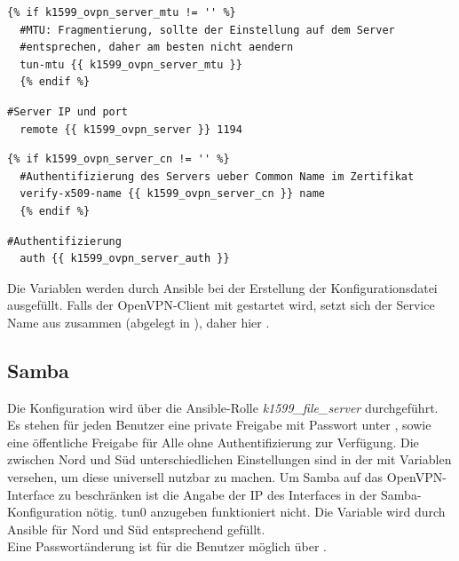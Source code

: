 \begin{lstlisting}[label=code:tunnelmtu,caption=Tunnel-MTU]
  {% if k1599_ovpn_server_mtu != '' %}
  #MTU: Fragmentierung, sollte der Einstellung auf dem Server
  #entsprechen, daher am besten nicht aendern
  tun-mtu {{ k1599_ovpn_server_mtu }}
  {% endif %}
\end{lstlisting}

\begin{lstlisting}[label=code:vpnserver,caption=OpenVPN-Server]
  #Server IP und port
  remote {{ k1599_ovpn_server }} 1194
\end{lstlisting}

\begin{lstlisting}[label=code:certtitle,caption=Zertifikats-Betreff]
  {% if k1599_ovpn_server_cn != '' %}
  #Authentifizierung des Servers ueber Common Name im Zertifikat
  verify-x509-name {{ k1599_ovpn_server_cn }} name
  {% endif %}
\end{lstlisting}

\begin{lstlisting}[label=code:authmethod,caption=Authentifizierungsmethode]
  #Authentifizierung
  auth {{ k1599_ovpn_server_auth }}
\end{lstlisting}

Die Variablen  werden durch Ansible bei der Erstellung der Konfigurationsdatei ausgefüllt. Falls der OpenVPN-Client mit  gestartet wird, setzt sich der Service Name aus  zusammen (abgelegt in ), daher hier .

\subsection{Samba}
Die Konfiguration wird über die Ansible-Rolle \textit{k1599\_file\_server} durchgeführt. Es stehen für jeden Benutzer eine private Freigabe mit Passwort unter , sowie eine öffentliche Freigabe  für Alle ohne Authentifizierung zur Verfügung. Die zwischen Nord und Süd unterschiedlichen Einstellungen sind in der  mit Variablen versehen, um diese universell nutzbar zu machen. Um Samba auf das OpenVPN-Interface zu beschränken ist die Angabe der IP des Interfaces in der Samba-Konfiguration nötig. tun0 anzugeben funktioniert nicht. Die Variable wird durch Ansible für Nord und Süd entsprechend gefüllt.\\

Eine Passwortänderung ist für die Benutzer möglich über
.

